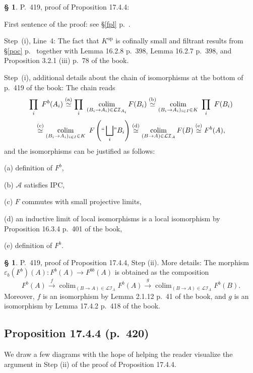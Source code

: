 \documentclass[12pt]{article}
\theoremstyle{remark}
\theoremstyle{definition}
\newtheorem{s}[thm]{\S}
\newcommand{\nn}{\noindent}
\newcommand{\cc}{\mathcal}
\newcommand{\A}{\mathcal A}
\newcommand{\ee}{\varepsilon}
\newcommand{\xr}{\xrightarrow}
\DeclareMathOperator*{\col}{colim}
\DeclareMathOperator{\op}{op}
\begin{document}
\begin{s}\label{1744i}
P.~419, proof of Proposition 17.4.4: 

First sentence of the proof: see \S\ref{fpl} p.~\pageref{fpl}. 

Step~(i), Line~4: The fact that $K^{\op}$ is cofinally small and filtrant results from \S\ref{poc} p.~\pageref{poc} together with Lemma 16.2.8 p.~398, Lemma 16.2.7 p.~398, and Proposition 3.2.1 (iii) p.~78 of the book. 

Step~(i), additional details about the chain of isomorphisms at the bottom of p.~419 of the book: The chain reads 
$$
\prod_i\ F^b(A_i)
\overset{(\text a)}{\simeq}\prod_i\ \col_{(B_i\to A_i)\in\cc{LI}_{A_i}}F(B_i)
\overset{(\text b)}{\simeq}\col_{(B_i\to A_i)_{i\in I}\in K}\ \prod_i\ F(B_i)
$$
$$
\overset{(\text c)}{\simeq}\col_{(B_i\to A_i)_{i\in I}\in K}\ F\left(``\bigsqcup_i\!"B_i\right)
\overset{(\text d)}{\simeq}\col_{(B\to A)\in\cc{LI}_A}F(B)
\overset{(\text e)}{\simeq}F^b(A), 
$$ 
and the isomorphisms can be justified as follows: 

\nn(a) definition of $F^b$, 

\nn(b) $\A$ satisfies IPC,

\nn(c) $F$ commutes with small projective limits, 

\nn(d) an inductive limit of local isomorphisms is a local isomorphism by Proposition 16.3.4 p.~401 of the book, 

\nn(e) definition of $F^b$. 
\end{s} 

%

\begin{s} 
P.~419, proof of Proposition 17.4.4, Step (ii). More details: The morphism $\ee_b(F^b)(A):F^b(A)\to F^{bb}(A)$ is obtained as the composition 
$$
F^b(A)\xr f\col_{(B\to A)\in\cc{LI}_A}F^b(A)\xr g\col_{(B\to A)\in\cc{LI}_A}F^b(B). 
$$ 
Moreover, $f$ is an isomorphism by Lemma 2.1.12 p.~41 of the book, and $g$ is an isomorphism by Lemma 17.4.2 p.~418 of the book.
\end{s}

%

\subsection{Proposition 17.4.4 (p.~420)}

We draw a few diagrams with the hope of helping the reader visualize the argument in Step (ii) of the proof of Proposition 17.4.4. 
\end{document}
